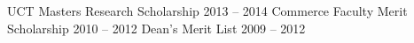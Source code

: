 
\begin{cvhonors}
  \cvhonor
    {}
    {UCT Masters Research Scholarship}
    {}
    {2013 -- 2014}
  \cvhonor
    {}
    {Commerce Faculty Merit Scholarship}
    {}
    {2010 -- 2012}
  \cvhonor
    {}
    {Dean's Merit List}
    {}
    {2009 -- 2012}

\end{cvhonors}

